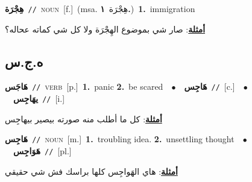 \documentclass[10pt,a4paper,twoside]{article} %
\begin{document}
\begin{multicols}{2}
{\setlength\topsep{0pt}\textbf{\foreignlanguage{arabic}{هِجْرَة}}\ {\color{gray}\texttt{//}\color{black}}\ \textsc{noun}\ [f.]\ \color{gray}(msa. \foreignlanguage{arabic}{هِجْرَة}~\foreignlanguage{arabic}{\textbf{١.}})\color{black}\ \textbf{1.}~immigration\  \begin{flushright}\color{gray}\foreignlanguage{arabic}{\textbf{\underline{\foreignlanguage{arabic}{أمثلة}}}: صار شي بموضوع الهِجْرَة ولا كل شي كماته عحاله؟}\end{flushright}\color{black}} \vspace{2mm}

\vspace{-3mm}
\subsection*{\color{blue}\foreignlanguage{arabic}{ه.ج.س}\color{blue}{}} 

{\setlength\topsep{0pt}\textbf{\foreignlanguage{arabic}{هَاجَس}}\ {\color{gray}\texttt{//}\color{black}}\ \textsc{verb}\ [p.]\ \textbf{1.}~panic  \textbf{2.}~be scared\ \ $\bullet$\ \ \setlength\topsep{0pt}\textbf{\foreignlanguage{arabic}{هَاجِس}}\ {\color{gray}\texttt{//}\color{black}}\ [c.]\ \ $\bullet$\ \ \setlength\topsep{0pt}\textbf{\foreignlanguage{arabic}{يهَاجِس}}\ {\color{gray}\texttt{//}\color{black}}\ [i.]\  \begin{flushright}\color{gray}\foreignlanguage{arabic}{\textbf{\underline{\foreignlanguage{arabic}{أمثلة}}}: كل ما أطلب منه صورته بيصير بيهاجِس}\end{flushright}\color{black}} \vspace{2mm}

{\setlength\topsep{0pt}\textbf{\foreignlanguage{arabic}{هَاجِس}}\ {\color{gray}\texttt{//}\color{black}}\ \textsc{noun}\ [m.]\ \textbf{1.}~troubling idea.  \textbf{2.}~unsettling thought\ \ $\bullet$\ \ \setlength\topsep{0pt}\textbf{\foreignlanguage{arabic}{هَوَاجِس}}\ {\color{gray}\texttt{//}\color{black}}\ [pl.]\  \begin{flushright}\color{gray}\foreignlanguage{arabic}{\textbf{\underline{\foreignlanguage{arabic}{أمثلة}}}: هاي الهَواجِس كلها براسك فش شي حقيقي}\end{flushright}\color{black}} \vspace{2mm}


\end{multicols}
\end{document}
